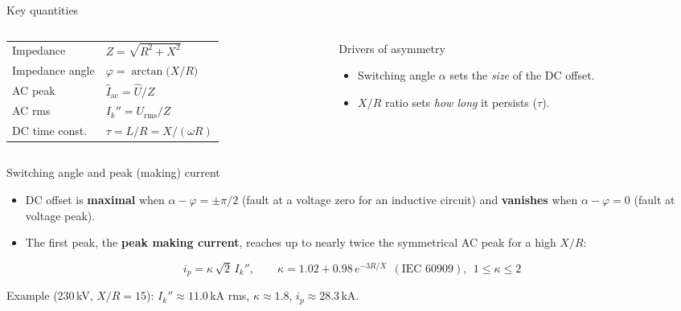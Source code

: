 \begin{frame}{Key quantities}
  \renewcommand{\arraystretch}{1.4}
  \begin{columns}[c,onlytextwidth]
    \begin{column}{0.52\textwidth}
      \begin{tabularx}{\linewidth}{@{}lX@{}}
        Impedance      & $Z=\sqrt{R^{2}+X^{2}}$ \\
        Impedance angle& $\varphi=\arctan\!\big(X/R\big)$ \\
        AC peak        & $\hat{I}_{\mathrm{ac}}=\hat U/Z$ \\
        AC rms         & $I_k''=U_{\mathrm{rms}}/Z$ \\
        DC time const. & $\tau=L/R=X/(\omega R)$ \\
      \end{tabularx}
    \end{column}
    \begin{column}{0.44\textwidth}
      \begin{block}{Drivers of asymmetry}
        \begin{itemize}
          \item Switching angle $\alpha$ sets the \emph{size} of the DC offset.
          \item $X/R$ ratio sets \emph{how long} it persists ($\tau$).
        \end{itemize}
      \end{block}
    \end{column}
  \end{columns}
\end{frame}


\begin{frame}{Switching angle and peak (making) current}
  \begin{itemize}
    \setlength{\itemsep}{0.5em}
    \item DC offset is \textbf{maximal} when $\alpha-\varphi=\pm\pi/2$
          (fault at a voltage zero for an inductive circuit) and \textbf{vanishes}
          when $\alpha-\varphi=0$ (fault at voltage peak).
    \item The first peak, the \textbf{peak making current}, reaches up to nearly
          twice the symmetrical AC peak for a high $X/R$:
  \end{itemize}
  \vspace{0.4em}
  \[ i_p=\kappa\,\sqrt{2}\,I_k'', \qquad
     \kappa=1.02+0.98\,e^{-3R/X}\ \ (\text{IEC }60909),\ \ 1\le\kappa\le 2 \]
  \vspace{0.2em}
  \begin{center}
    {\color{atGray}\footnotesize
    Example (230\,kV, $X/R=15$): $I_k''\approx 11.0$\,kA rms, $\kappa\approx 1.8$,
    $i_p\approx 28.3$\,kA.}
  \end{center}
\end{frame}


